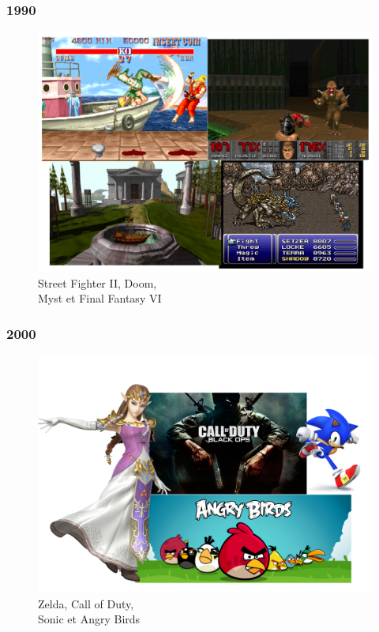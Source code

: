 \begin{minipage}[t]{.48\textwidth}
	\subsubsection{1990}
	\begin{figure}[H]
		\captionsetup{format=myformat}
		\center
		\includegraphics[width=\linewidth]{./images/Introduction/imagdle1990.png}
		\caption{Street Fighter II, Doom,\\ Myst et Final Fantasy VI}
	\end{figure}
\end{minipage}\hspace{.04\textwidth}\begin{minipage}[t]{.48\textwidth}
	\subsubsection{2000}
	\begin{figure}[H]
		\captionsetup{format=myformat}
		\center
		\includegraphics[width=\linewidth]{./images/Introduction/imagdle2000.png}
		\caption{Zelda, Call of Duty,\\Sonic et Angry Birds}
	\end{figure}
\end{minipage}
\vspace{\baselineskip}
